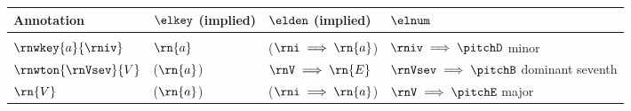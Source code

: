 \begin{tabular}{l|lll}
Annotation & $\elkey$ (implied)       & $\elden$ (implied)       & $\elnum$ \\
\hline \\
$\rnwkey{a}{\rniv}$         & $\rn{a}$              & ($\rni \implies \rn{a}$)       & $\rniv \implies \pitchD$ minor      \\
$\rnwton{\rnVsev}{V}$       & ($\rn{a}$)            & $\rnV \implies \rn{E}$         & $\rnVsev \implies \pitchB$ dominant seventh \\
$\rn{V}$                    & ($\rn{a}$)            & ($\rni \implies \rn{a}$)       & $\rnV \implies \pitchE$ major     
\end{tabular}
